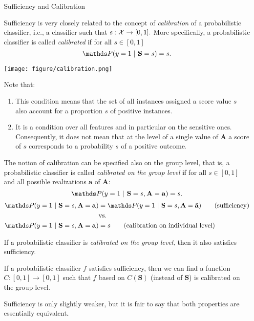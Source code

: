 \documentclass[11pt,compress,t,notes=noshow, xcolor=table]{beamer}
\newcommand{\sens}{\mathbf{A}} %
\newcommand{\ba}{\mathbf{a}}
\newcommand{\batilde}{\tilde{\mathbf{a}}}
\begin{document}
\begin{vbframe}{Sufficiency and Calibration}
	\footnotesize{
		\begin{itemize}
			\begin{minipage}{0.45\textwidth}
				\item Sufficiency is very closely related to the concept of \emph{calibration} of a probabilistic classifier, i.e., a classifier such that $s:\mathcal{X} \to [0,1].$ More specifically, a probabilistic classifier is called \emph{calibrated} if for all $s\in[0,1]$
				$$  \P(  y = 1 ~|~ \mathbf{S} = s  ) = s. $$
			\end{minipage}
		\begin{minipage}{0.45\textwidth}
			\centering
			\texttt{[image: figure/calibration.png]}
		\end{minipage}
%			
			\item Note that: 
%			
			\begin{enumerate}
%				
			\footnotesize
%			
				\item This condition means that the set of all instances assigned a score value $s$ also account for a proportion $s$ of positive instances.
%				
				\item It is a condition over all features and in particular on the sensitive ones. Consequently, it does not mean that at the level of a single value of $\sens$ a score of $s$ corresponds to a probability $s$ of a positive outcome. 
%			
			\end{enumerate}
%
			\item The notion of calibration can be specified also on the group level, that is,  a probabilistic classifier is called \emph{calibrated on the group level} if for all $s\in[0,1]$ and all possible realizations $\ba$ of $\sens:$
%			
			$$  \P(  y = 1 ~|~ \mathbf{S} = s, \sens = \ba  ) = s. $$
%			 
%
			\framebreak
%			
			\begin{align*}
				\P(  y = 1 ~|~ \mathbf{S} = s, \sens = \ba ) &= \P(  y = 1 ~|~  \mathbf{S} = s, \sens = \batilde ) \tag{sufficiency} \\
				&\mbox{vs.} \\
				\P(  y = 1 ~|~ \mathbf{S} = s, \sens = \ba  ) &= s \tag{calibration on individual level}
			\end{align*}
%		
			\item If a probabilistic classifier is \emph{calibrated on the group level,} then it also satisfies sufficiency.
%			
			\item If a probabilistic classifier $f$ satisfies sufficiency, then we can find a function $C:[0,1] \to [0,1]$ such that $f$ based on $C(\mathbf{S})$ (instead of $\mathbf{S}$) is calibrated on the group level.
%			
			\item Sufficiency is only slightly weaker, but it is fair to say that both properties are essentially equivalent.
%			
		\end{itemize}
	}
\end{vbframe}
\end{document}
